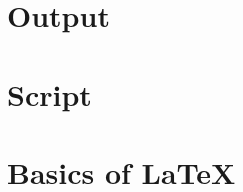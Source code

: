 \section{Output}

\newpage
\section{Script}

\newpage

\section{Basics of \LaTeX{}}
\label{sec:bol}

